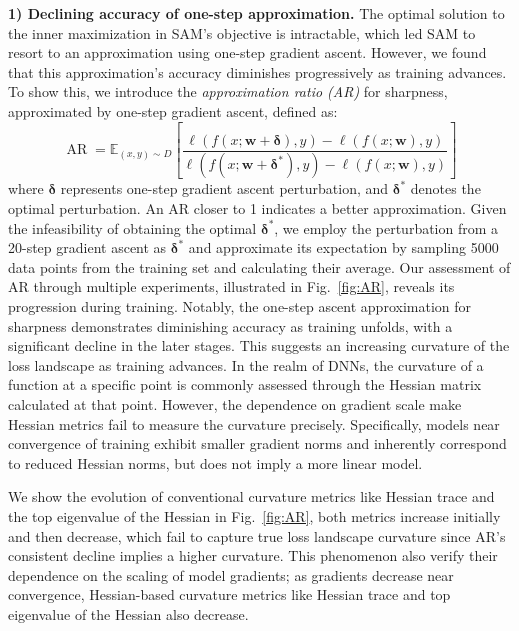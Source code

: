 \documentclass[letterpaper]{article} %
\theoremstyle{plain}
\theoremstyle{definition}
\newcommand{\fref}[1]{Fig.~\ref{#1}}
\begin{document}
\textbf{1) Declining accuracy of one-step approximation.} 
The optimal solution to the inner maximization in SAM's objective is intractable, which led SAM to resort to an approximation using one-step gradient ascent. However, we found that this approximation's accuracy diminishes progressively as training advances. To show this, we introduce the \emph{approximation ratio (AR)} for sharpness, approximated by one-step gradient ascent, defined as:
\vspace{-0.5cm}
\begin{equation}
\operatorname{AR} = \mathbb{E}_{(x, y) \sim D}\left[\frac{\ell\left(f\left(x; \boldsymbol{w+\delta}\right), y\right)-\ell\left(f\left(x ; \boldsymbol{w}\right), y\right)}{\ell\left(f\left(x; \boldsymbol{w+\delta^*}\right), y\right)-\ell\left(f\left(x ; \boldsymbol{w}\right), y\right)}\right]
\end{equation}
where $\boldsymbol{\delta}$ represents one-step gradient ascent perturbation, and $\boldsymbol{\delta^*}$ denotes the optimal perturbation. An AR closer to 1 indicates a better approximation. Given the infeasibility of obtaining the optimal $\boldsymbol{\delta^*}$, we employ the perturbation from a 20-step gradient ascent as $\boldsymbol{\delta^*}$ and approximate its expectation by sampling 5000 data points from the training set and calculating their average. Our assessment of AR through multiple experiments, illustrated in \fref{fig:AR}, reveals its progression during training. Notably, the one-step ascent approximation for sharpness demonstrates diminishing accuracy as training unfolds, with a significant decline in the later stages. This suggests an increasing curvature of the loss landscape as training advances. In the realm of DNNs, the curvature of a function at a specific point is commonly assessed through the Hessian matrix calculated at that point. However, the dependence on gradient scale make Hessian metrics fail to measure the curvature precisely. Specifically, models near convergence of training exhibit smaller gradient norms and inherently correspond to reduced Hessian norms, but does not imply a more linear model.

We show the evolution of conventional curvature metrics like Hessian trace and the top eigenvalue of the Hessian in \fref{fig:AR}, both metrics increase initially and then decrease, which fail to capture true loss landscape curvature since AR's consistent decline implies a higher curvature. This phenomenon also verify their dependence on the scaling of model gradients; as gradients decrease near convergence, Hessian-based curvature metrics like Hessian trace and top eigenvalue of the Hessian also decrease.
\end{document}
